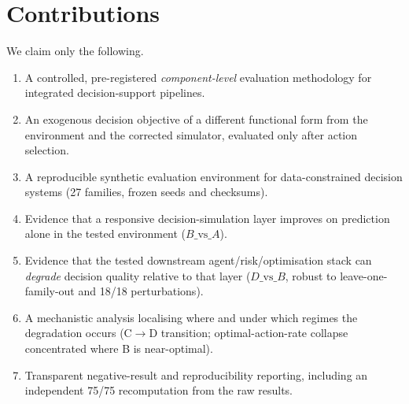 \documentclass[10pt,twocolumn,a4paper]{article}
\begin{document}
\section{Contributions}\label{sec:contrib}
We claim only the following.
\begin{enumerate}
  \item A controlled, pre-registered \emph{component-level} evaluation
        methodology for integrated decision-support pipelines.
  \item An exogenous decision objective of a different functional form from the
        environment and the corrected simulator, evaluated only after action
        selection.
  \item A reproducible synthetic evaluation environment for data-constrained
        decision systems (27 families, frozen seeds and checksums).
  \item Evidence that a responsive decision-simulation layer improves on
        prediction alone in the tested environment ($B\text{\_vs\_}A$).
  \item Evidence that the tested downstream agent/risk/optimisation stack can
        \emph{degrade} decision quality relative to that layer
        ($D\text{\_vs\_}B$, robust to leave-one-family-out and 18/18
        perturbations).
  \item A mechanistic analysis localising where and under which regimes the
        degradation occurs (C$\to$D transition; optimal-action-rate collapse
        concentrated where B is near-optimal).
  \item Transparent negative-result and reproducibility reporting, including an
        independent 75/75 recomputation from the raw results.
\end{enumerate}

\end{document}
